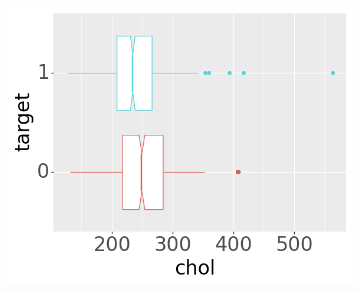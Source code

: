 \begin{figure}[b]
\begin{subfigure}[b]{0.32\textwidth}
         \includegraphics[width=\textwidth]{plots/target-chol}
     \end{subfigure}


\end{figure}
